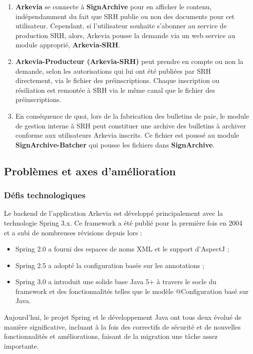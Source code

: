 \begin{enumerate}
    \item  \textbf{Arkevia} se connecte à \textbf{SignArchive} pour en afficher le contenu, indépendamment du fait que SRH publie ou non des documents pour cet utilisateur. Cependant, si l’utilisateur souhaite s’abonner au service de production SRH, alors, Arkevia pousse la demande via un web service au module approprié, \textbf{Arkevia-SRH}.

    \item \textbf{Arkevia-Producteur (Arkevia-SRH)} peut prendre en compte ou non la demande, selon les autorisations qui lui ont été publiées par SRH directement, via le fichier des préinscriptions. Chaque inscription ou résiliation est remontée à SRH via le même canal que le fichier des préinscriptions.

    \item En conséquence de quoi, lors de la fabrication des bulletins de paie, le module de gestion interne à SRH peut constituer une archive des bulletins à archiver conforme aux utilisateurs Arkevia inscrits. Ce fichier est poussé au module \textbf{SignArchive-Batcher} qui pousse les fichiers dans \textbf{SignArchive}.
\end{enumerate}
\subsection{Problèmes et axes d'amélioration}
\subsubsection{Défis technologiques}
Le backend de l'application Arkevia est développé principalement avec la technologie Spring 3.x. Ce framework a été publié pour la première fois en 2004 et a subi de nombreuses révisions depuis lors : 
\begin{itemize}
    \item Spring 2.0 a fourni des espaces de noms XML et le support d'AspectJ ; 
    \item Spring 2.5 a adopté la configuration basée sur les annotations ; 
    \item Spring 3.0 a introduit une solide base Java 5+ à travers le socle du framework et des fonctionnalités telles que le modèle @Configuration basé sur Java.\\
\end{itemize}

Aujourd'hui, le projet Spring et le développement Java ont tous deux évolué de manière significative, incluant à la fois des correctifs de sécurité et de nouvelles fonctionnalités et améliorations, faisant de la migration une tâche assez importante.

